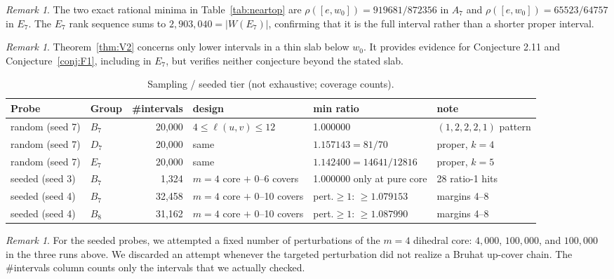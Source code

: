 \documentclass[11pt]{amsart}
\theoremstyle{plain}
\theoremstyle{definition}
\theoremstyle{remark}
\newtheorem{remark}[theorem]{Remark}
\begin{document}
\begin{remark}
The two exact rational minima in Table~\ref{tab:neartop} are
$\rho([e,w_0])=919681/872356$ in $A_7$ and
$\rho([e,w_0])=65523/64757$ in $E_7$. The $E_7$ rank sequence sums to
$2{,}903{,}040=|W(E_7)|$, confirming that it is the full interval rather
than a shorter proper interval.
\end{remark}

\begin{remark}
Theorem~\ref{thm:V2} concerns only lower intervals in a thin slab below
$w_0$. It provides evidence for Conjecture 2.11 and
Conjecture~\ref{conj:F1}, including in $E_7$, but verifies neither
conjecture beyond the stated slab.
\end{remark}

\begin{table}[htbp]
\centering
\caption{Sampling / seeded tier (not exhaustive; coverage counts).}
\label{tab:sampling}
\small
\begin{tabular}{@{}llrlll@{}}
\toprule
Probe & Group & \#intervals & design & min ratio & note \\
\midrule
random (seed 7) & $B_7$ & 20{,}000 & $4\le\ell(u,v)\le12$ & 1.000000 & $(1,2,2,2,1)$ pattern \\
random (seed 7) & $D_7$ & 20{,}000 & same & $1.157143=81/70$ & proper, $k{=}4$ \\
random (seed 7) & $E_7$ & 20{,}000 & same & $1.142400=14641/12816$ & proper, $k{=}5$ \\
seeded (seed 3) & $B_7$ & 1{,}324 & $m{=}4$ core $+$ 0--6 covers & 1.000000 only at pure core & 28 ratio-1 hits \\
seeded (seed 4) & $B_7$ & 32{,}458 & $m{=}4$ core $+$ 0--10 covers & pert.$\ge1$: $\ge 1.079153$ & margins 4--8 \\
seeded (seed 4) & $B_8$ & 31{,}162 & $m{=}4$ core $+$ 0--10 covers & pert.$\ge1$: $\ge 1.087990$ & margins 4--8 \\
\bottomrule
\end{tabular}
\end{table}

\begin{remark}
For the seeded probes, we attempted a fixed number of perturbations of the
$m=4$ dihedral core: $4{,}000$, $100{,}000$, and $100{,}000$ in the three
runs above. We discarded an attempt whenever the targeted perturbation did
not realize a Bruhat up-cover chain. The \#intervals column counts only the
intervals that we actually checked.
\end{remark}
\end{document}
